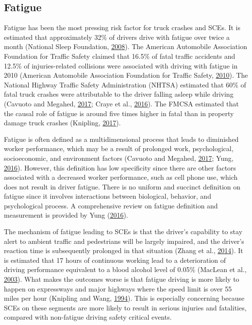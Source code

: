 \documentclass[12pt]{book}
\numberwithin{equation}{chapter}
\begin{document}
\hypertarget{fatigue}{%
\subsection{Fatigue}\label{fatigue}}

Fatigue has been the most pressing risk factor for truck crashes and SCEs. It is estimated that approximately 32\% of drivers drive with fatigue over twice a month (National Sleep Foundation, \protect\hyperlink{ref-nsleepf}{2008}). The American Automobile Association Foundation for Traffic Safety claimed that 16.5\% of fatal traffic accidents and 12.5\% of injuries-related collisions were associated with driving with fatigue in 2010 (American Automobile Association Foundation for Traffic Safety, \protect\hyperlink{ref-aaafoundation}{2010}). The National Highway Traffic Safety Administration (NHTSA) estimated that 60\% of fatal truck crashes were attributable to the driver falling asleep while driving (Cavuoto and Megahed, \protect\hyperlink{ref-cavuoto2017understanding}{2017}; Craye et al., \protect\hyperlink{ref-craye2016multi}{2016}). The FMCSA estimated that the causal role of fatigue is around five times higher in fatal than in property damage truck crashes (Knipling, \protect\hyperlink{ref-knipling2017threats}{2017}).

Fatigue is often defined as a multidimensional process that leads to diminished worker performance, which may be a result of prolonged work, psychological, socioeconomic, and environment factors (Cavuoto and Megahed, \protect\hyperlink{ref-cavuoto2017understanding}{2017}; Yung, \protect\hyperlink{ref-yung2016fatigue}{2016}). However, this definition has low specificity since there are other factors associated with a decreased worker performance, such as cell phone use, which does not result in driver fatigue. There is no uniform and succinct definition on fatigue since it involves interactions between biological, behavior, and psychological process. A comprehensive review on fatigue definition and measurement is provided by Yung (\protect\hyperlink{ref-yung2016fatigue}{2016}).

The mechanism of fatigue leading to SCEs is that the driver's capability to stay alert to ambient traffic and pedestrians will be largely impaired, and the driver's reaction time is subsequently prolonged in that situation (Zhang et al., \protect\hyperlink{ref-zhang2014study}{2014}). It is estimated that 17 hours of continuous working lead to a deterioration of driving performance equivalent to a blood alcohol level of 0.05\% (MacLean et al., \protect\hyperlink{ref-maclean2003hazards}{2003}). What makes the outcomes worse is that fatigue driving is more likely to happen on expressways and major highways where the speed limit is over 55 miles per hour (Knipling and Wang, \protect\hyperlink{ref-knipling1994crashes}{1994}). This is especially concerning because SCEs on these segments are more likely to result in serious injuries and fatalities, compared with non-fatigue driving safety critical events.
\end{document}
